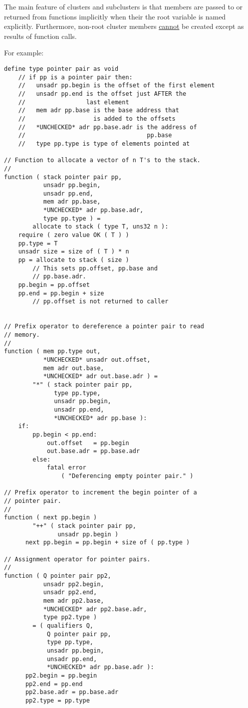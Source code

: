 \documentclass[12pt]{article}
\newenvironment{indpar}[1][0.3in]%
	{\begin{list}{}%
		     {\setlength{\itemsep}{0in}%
		      \setlength{\topsep}{0in}%
		      \setlength{\parsep}{1ex}%
		      \setlength{\labelwidth}{#1}%
		      \setlength{\leftmargin}{#1}%
		      \addtolength{\leftmargin}{\labelsep}}%
	 \item}%
	{\end{list}}
\begin{document}
The main feature of clusters and subclusters
is that members are passed to or returned
from functions implicitly when their the root variable is named
explicitly.  Furthermore, non-root cluster members \underline{cannot}
be created except as results of function calls.

For example:
\begin{indpar}\begin{verbatim}
define type pointer pair as void
    // if pp is a pointer pair then:
    //   unsadr pp.begin is the offset of the first element
    //   unsadr pp.end is the offset just AFTER the
    //                 last element
    //   mem adr pp.base is the base address that
    //                   is added to the offsets
    //   *UNCHECKED* adr pp.base.adr is the address of
    //                                  pp.base
    //   type pp.type is type of elements pointed at

// Function to allocate a vector of n T's to the stack.
//
function ( stack pointer pair pp,
           unsadr pp.begin,
           unsadr pp.end,
           mem adr pp.base,
           *UNCHECKED* adr pp.base.adr,
           type pp.type ) =
        allocate to stack ( type T, uns32 n ):
    require ( zero value OK ( T ) )
    pp.type = T
    unsadr size = size of ( T ) * n
    pp = allocate to stack ( size )
        // This sets pp.offset, pp.base and
        // pp.base.adr.
    pp.begin = pp.offset
    pp.end = pp.begin + size
        // pp.offset is not returned to caller


// Prefix operator to dereference a pointer pair to read
// memory.
//
function ( mem pp.type out,
           *UNCHECKED* unsadr out.offset,
           mem adr out.base,
           *UNCHECKED* adr out.base.adr ) =
        "*" ( stack pointer pair pp,
              type pp.type,
              unsadr pp.begin,
              unsadr pp.end,
              *UNCHECKED* adr pp.base ):
    if:
        pp.begin < pp.end:
            out.offset   = pp.begin
            out.base.adr = pp.base.adr
        else:
            fatal error
                ( "Deferencing empty pointer pair." )

// Prefix operator to increment the begin pointer of a
// pointer pair.
//
function ( next pp.begin )
        "++" ( stack pointer pair pp,
               unsadr pp.begin )
      next pp.begin = pp.begin + size of ( pp.type )

// Assignment operator for pointer pairs.
//
function ( Q pointer pair pp2,
           unsadr pp2.begin,
           unsadr pp2.end,
           mem adr pp2.base,
           *UNCHECKED* adr pp2.base.adr,
           type pp2.type )
        = ( qualifiers Q,
            Q pointer pair pp,
            type pp.type,
            unsadr pp.begin,
            unsadr pp.end,
            *UNCHECKED* adr pp.base.adr ):
      pp2.begin = pp.begin
      pp2.end = pp.end
      pp2.base.adr = pp.base.adr
      pp2.type = pp.type


\end{verbatim}
\end{indpar}
\end{document}
